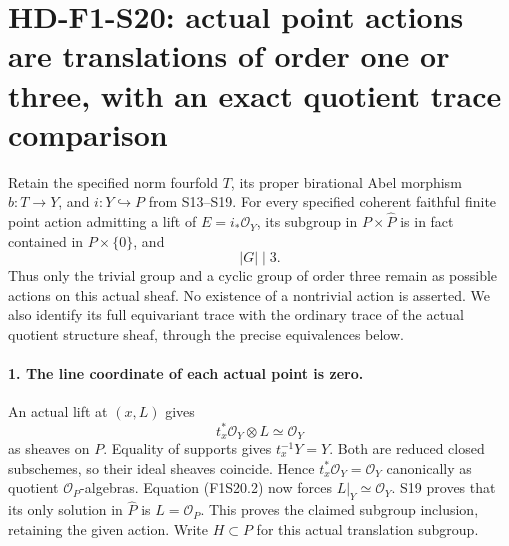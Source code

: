 \section[HD-F1-S20: actual translations and quotient trace maps]{HD-F1-S20: actual point actions are translations of order one or three, with an exact quotient trace comparison}
\label{sec:f1-norm-fourfold-translation-quotients}

Retain the specified norm fourfold $T$, its proper birational
Abel morphism $b:T\to Y$, and $i:Y\hookrightarrow P$ from
S13--S19. For every specified coherent faithful finite point
action admitting a lift of $E=i_*\mathcal O_Y$, its subgroup
in $P\times\widehat P$ is in fact contained in $P\times\{0\}$,
and
\[
                              |G|\mid3.
 \tag{F1S20.1}
\]
Thus only the trivial group and a cyclic group of order three
remain as possible actions on this actual sheaf. No existence
of a nontrivial action is asserted. We also identify its full
equivariant trace with the ordinary trace of the actual quotient
structure sheaf, through the precise equivalences below.

\paragraph{1. The line coordinate of each actual point is zero.}
An actual lift at $(x,L)$ gives
\[
                     t_x^*\mathcal O_Y\otimes L
                                      \simeq\mathcal O_Y
 \tag{F1S20.2}
\]
as sheaves on $P$. Equality of supports gives $t_x^{-1}Y=Y$.
Both are reduced closed subschemes, so their ideal sheaves
coincide. Hence $t_x^*\mathcal O_Y=\mathcal O_Y$ canonically
as quotient $\mathcal O_P$-algebras. Equation (F1S20.2) now
forces $L|_Y\simeq\mathcal O_Y$. S19 proves that its only
solution in $\widehat P$ is $L=\mathcal O_P$. This proves
the claimed subgroup inclusion, retaining the given action.
Write $H\subset P$ for this actual translation subgroup.

